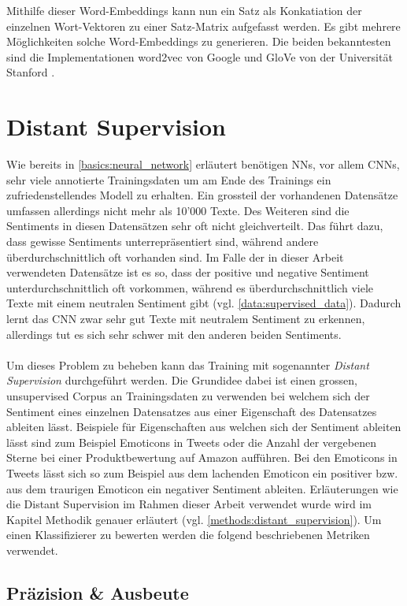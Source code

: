 Mithilfe dieser Word-Embeddings kann nun ein Satz als Konkatiation der einzelnen Wort-Vektoren zu einer Satz-Matrix aufgefasst werden. Es gibt mehrere Möglichkeiten solche Word-Embeddings zu generieren. Die beiden bekanntesten sind die Implementationen word2vec von Google \cite{mikolov2013distributed} und GloVe von der Universität Stanford \cite{pennington2014glove}.

\section{Distant Supervision}
Wie bereits in \ref{basics:neural_network} erläutert benötigen NNs, vor allem CNNs, sehr viele annotierte Trainingsdaten  um am Ende des Trainings ein zufriedenstellendes Modell zu erhalten. Ein grossteil der vorhandenen Datensätze umfassen allerdings nicht mehr als 10'000 Texte. Des Weiteren sind die Sentiments in diesen Datensätzen sehr oft nicht gleichverteilt. Das führt dazu, dass gewisse Sentiments unterrepräsentiert sind, während andere überdurchschnittlich oft vorhanden sind. Im Falle der in dieser Arbeit verwendeten Datensätze ist es so, dass der positive und negative Sentiment unterdurchschnittlich oft vorkommen, während es überdurchschnittlich viele Texte mit einem neutralen Sentiment gibt (vgl. \ref{data:supervised_data}). Dadurch lernt das CNN zwar sehr gut Texte mit neutralem Sentiment zu erkennen, allerdings tut es sich sehr schwer mit den anderen beiden Sentiments.\\\\
Um dieses Problem zu beheben kann das Training mit sogenannter \emph{Distant Supervision} \cite{} durchgeführt werden. Die Grundidee dabei ist einen grossen, unsupervised Corpus an Trainingsdaten zu verwenden bei welchem sich der Sentiment eines einzelnen Datensatzes aus einer Eigenschaft des Datensatzes ableiten lässt. Beispiele für Eigenschaften aus welchen sich der Sentiment ableiten lässt sind zum Beispiel Emoticons in Tweets oder die Anzahl der vergebenen Sterne bei einer Produktbewertung auf Amazon aufführen. Bei den Emoticons in Tweets lässt sich so zum Beispiel aus dem lachenden Emoticon \quotes{:-)} ein positiver bzw. aus dem traurigen Emoticon \quotes{:-(} ein negativer Sentiment ableiten. Erläuterungen wie die Distant Supervision im Rahmen dieser Arbeit verwendet wurde wird im Kapitel Methodik genauer erläutert (vgl. \ref{methods:distant_supervision}).
Um einen Klassifizierer zu bewerten werden die folgend beschriebenen Metriken verwendet.
\subsection{Präzision {\&} Ausbeute}
\label{basics:metrics:precision_recall}

